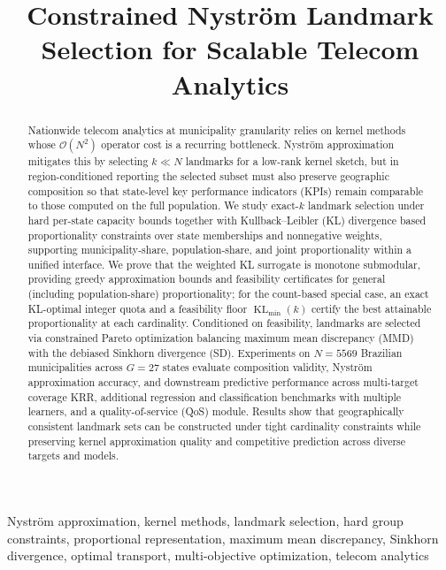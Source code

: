\documentclass[10pt,journal]{IEEEtran}
\title{Constrained Nyström Landmark Selection for Scalable Telecom Analytics}
\author{%
\IEEEauthorblockN{Author One\IEEEauthorrefmark{1},
Author Two\IEEEauthorrefmark{2}}
}
\newcommand{\datasetN}{5569}              %
\newcommand{\1}{\mathbf{1}}
\DeclareMathOperator{\KL}{KL}
\theoremstyle{ieeethm}
\begin{document}
\maketitle




\begin{abstract}
Nationwide telecom analytics at municipality granularity relies on kernel methods whose $\mathcal{O}(N^2)$ operator cost is a recurring bottleneck. Nyström approximation mitigates this by selecting $k\!\ll\!N$ landmarks for a low-rank kernel sketch, but in region-conditioned reporting the selected subset must also preserve geographic composition so that state-level key performance indicators (KPIs) remain comparable to those computed on the full population. We study exact-$k$ landmark selection under hard per-state capacity bounds together with Kullback--Leibler (KL) divergence based proportionality constraints over state memberships and nonnegative weights, supporting municipality-share, population-share, and joint proportionality within a unified interface. We prove that the weighted KL surrogate is monotone submodular, providing greedy approximation bounds and feasibility certificates for general (including population-share) proportionality; for the count-based special case, an exact KL-optimal integer quota and a feasibility floor $\KL_{\min}(k)$ certify the best attainable proportionality at each cardinality. Conditioned on feasibility, landmarks are selected via constrained Pareto optimization balancing maximum mean discrepancy (MMD) with the debiased Sinkhorn divergence (SD). Experiments on $N=\datasetN$ Brazilian municipalities across $G=27$ states evaluate composition validity, Nyström approximation accuracy, and downstream predictive performance across multi-target coverage KRR, additional regression and classification benchmarks with multiple learners, and a quality-of-service (QoS) module. Results show that geographically consistent landmark sets can be constructed under tight cardinality constraints while preserving kernel approximation quality and competitive prediction across diverse targets and models.
\end{abstract}







\begin{IEEEkeywords}
Nyström approximation, kernel methods, landmark selection, hard group constraints,
proportional representation, maximum mean discrepancy, Sinkhorn divergence, optimal transport,
multi-objective optimization, telecom analytics
\end{IEEEkeywords}
\end{document}
